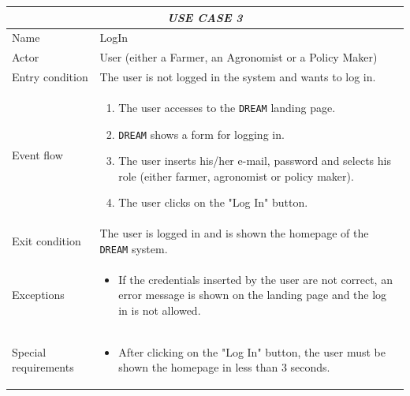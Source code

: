 \documentclass{article}
\begin{document}
\centering
\begin{longtable}{|p{3.5cm}|m{8cm}|}
 \hline
 \multicolumn{2}{|c|}{\cellcolor{white}\emph{USE CASE 3}} \\
 \endfirsthead
 \endhead
 \endfoot
 \endlastfoot
 \hline
 Name & LogIn\\
 \hline
 Actor & User (either a Farmer, an Agronomist or a Policy Maker)\\
 \hline
 Entry condition & The user is not logged in the system and wants to log in.\\
 \hline
 Event flow & \begin{enumerate}
    \item The user accesses to the \verb|DREAM| landing page.
    \item \verb|DREAM| shows a form for logging in.
    \item The user inserts his/her e-mail, password and selects his role (either farmer, agronomist or policy maker).
    \item The user clicks on the "Log In" button. 
 \end{enumerate}\\
 \hline
 Exit condition & The user is logged in and is shown the homepage of the \verb|DREAM| system.\\
 \hline
 Exceptions & \begin{itemize}
     \item If the credentials inserted by the user are not correct, an error message is shown on the landing page and the log in is not allowed.
 \end{itemize}\\
 \hline
 Special requirements & \begin{itemize}
     \item After clicking on the "Log In" button, the user must be shown the homepage in less than 3 seconds.
 \end{itemize}\\
 \hline
\end{longtable}
\end{document}
